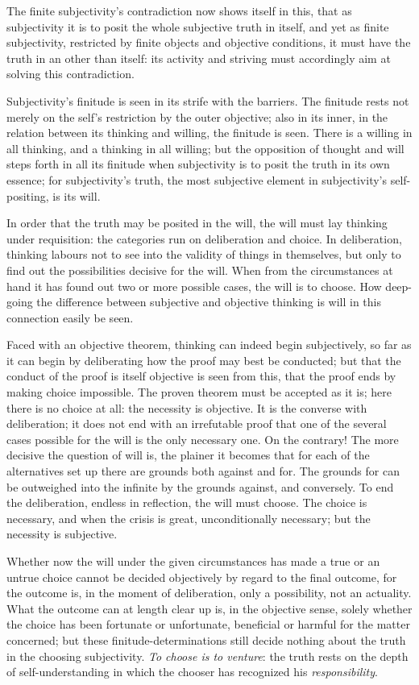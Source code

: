\documentclass[12pt]{book}
\begin{document}
The finite subjectivity's contradiction now shows itself in this,
that as subjectivity it is to posit the whole subjective truth in
itself, and yet as finite subjectivity, restricted by finite objects
and objective conditions, it must have the truth in an other than
itself: its activity and striving must accordingly aim at solving
this contradiction.

Subjectivity's finitude is seen in its strife with the barriers. The
finitude rests not merely on the self's restriction by the outer
objective; also in its inner, in the relation between its thinking
and willing, the finitude is seen. There is a willing in all
thinking, and a thinking in all willing; but the opposition of
thought and will steps forth in all its finitude when subjectivity
is to posit the truth in its own essence; for subjectivity's truth,
the most subjective element in subjectivity's self-positing, is its
will.

In order that the truth may be posited in the will, the will must
lay thinking under requisition: the categories run on deliberation
and choice. In deliberation, thinking labours not to see into the
validity of things in themselves, but only to find out the
possibilities decisive for the will. When from the circumstances at
hand it has found out two or more possible cases, the will is to
choose. How deep-going the difference between subjective and
objective thinking is will in this connection easily be seen.

Faced with an objective theorem, thinking can indeed begin
subjectively, so far as it can begin by deliberating how the proof
may best be conducted; but that the conduct
of the proof is itself objective is seen from this, that the proof
ends by making choice impossible. The proven theorem must be
accepted as it is; here there is no choice at all: the necessity is
objective. It is the converse with deliberation; it does not end
with an irrefutable proof that one of the several cases possible for
the will is the only necessary one. On the contrary! The more
decisive the question of will is, the plainer it becomes that for
each of the alternatives set up there are grounds both against and
for. The grounds for can be outweighed into the infinite by the
grounds against, and conversely. To end the deliberation, endless in
reflection, the will must choose. The choice is necessary, and when
the crisis is great, unconditionally necessary; but the necessity is
subjective.

Whether now the will under the given circumstances has made a true
or an untrue choice cannot be decided objectively by regard to the
final outcome, for the outcome is, in the moment of deliberation,
only a possibility, not an actuality. What the outcome can at length
clear up is, in the objective sense, solely whether the choice has
been fortunate or unfortunate, beneficial or harmful for the matter
concerned; but these finitude-determinations still decide nothing
about the truth in the choosing subjectivity. \emph{To choose is to
venture}: the truth rests on the depth of self-understanding in
which the chooser has recognized his \emph{responsibility}.
\end{document}
